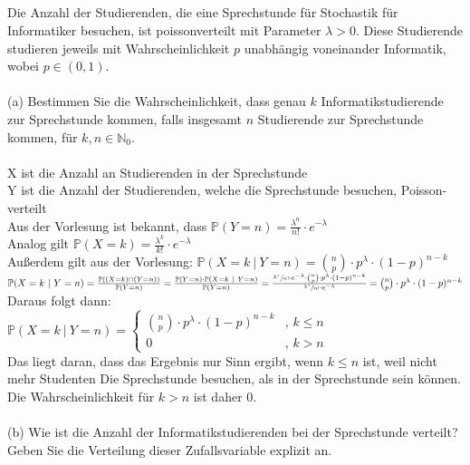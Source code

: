 \documentclass[a4paper]{article}
\begin{document}
\subsection{}
Die Anzahl der Studierenden, die eine Sprechstunde für Stochastik für Informatiker besuchen, ist poissonverteilt mit Parameter $\lambda > 0$. Diese Studierende studieren jeweils mit Wahrscheinlichkeit $p$ unabhängig voneinander Informatik, wobei $p \in (0, 1)$.\\\\
(a) Bestimmen Sie die Wahrscheinlichkeit, dass genau $k$ Informatikstudierende zur Sprechstunde kommen, falls insgesamt $n$ Studierende zur Sprechstunde kommen, für $k, n \in \mathbb{N}_0$.\\\\
X ist die Anzahl an Studierenden in der Sprechstunde\\
Y ist die Anzahl der Studierenden, welche die Sprechstunde besuchen, Poisson-verteilt\\
Aus der Vorlesung ist bekannt, dass $\mathbb{P}(Y = n) = \frac{\lambda^n}{n!}\cdot e^{-\lambda}$\\
Analog gilt $\mathbb{P}(X = k) = \frac{\lambda^k}{k!}\cdot e^{-\lambda}$\\
Außerdem gilt aus der Vorlesung: $\mathbb{P}(X = k\ |\ Y = n) = \binom{n}{p} \cdot p^\lambda \cdot (1 - p)^{n - k}$\\
$\mathbb{P}(X = k\ |\ Y = n) = \frac{\mathbb{P}((X = k) \cap (Y = n))}{\mathbb{P}(Y = n)} = \frac{ \mathbb{P}(Y = n) \cdot \mathbb{P}(X = k\ |\ Y = n)}{\mathbb{P}(Y = n)} = \frac{\sfrac{\lambda^n}{n!}\cdot e^{-\lambda} \cdot \binom{n}{p} \cdot p^\lambda \cdot (1 - p)^{n - k}}{\sfrac{\lambda^n}{n!} \cdot e^{-\lambda}} = \binom{n}{p} \cdot p^\lambda \cdot (1 - p)^{n - k}$\\
Daraus folgt dann:\\
$\mathbb{P}(X = k\ |\ Y = n) =
\begin{cases}
    \text{$\binom{n}{p} \cdot p^\lambda \cdot (1 - p)^{n - k}$} & \text{, } k \leq n \\
    \text{0} & \text{, } k > n
\end{cases}$\\
Das liegt daran, dass das Ergebnis nur Sinn ergibt, wenn $k \leq n$ ist, weil nicht mehr Studenten Die Sprechstunde besuchen, als in der Sprechstunde sein können. Die Wahrscheinlichkeit für  $k > n$ ist daher 0.
\\\\
(b) Wie ist die Anzahl der Informatikstudierenden bei der Sprechstunde verteilt? Geben Sie die Verteilung dieser Zufallsvariable explizit an.
\end{document}
